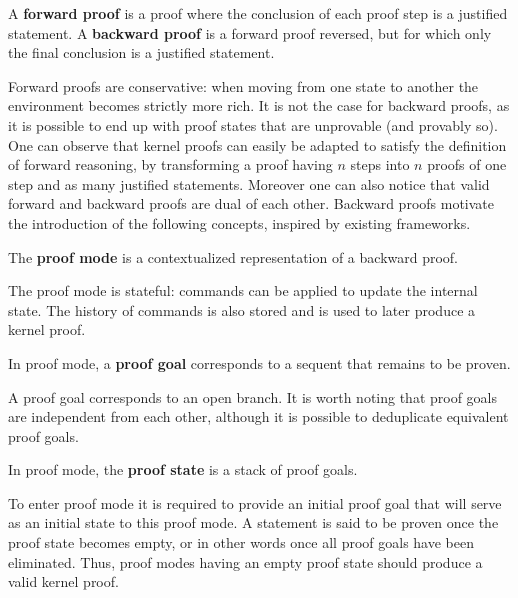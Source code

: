 \begin{definition}
A \textbf{forward proof} is a proof where the conclusion of each proof step is a justified statement.
A \textbf{backward proof} is a forward proof reversed, but for which only the final conclusion is a justified statement.
\end{definition}

Forward proofs are conservative: when moving from one state to another the environment becomes strictly more rich. It is not the case for backward proofs, as it is possible to end up with proof states that are unprovable (and provably so). One can observe that kernel proofs can easily be adapted to satisfy the definition of forward reasoning, by transforming a proof having $n$ steps into $n$ proofs of one step and as many justified statements. Moreover one can also notice that valid forward and backward proofs are dual of each other. Backward proofs motivate the introduction of the following concepts, inspired by existing frameworks.

\begin{definition}
The \textbf{proof mode} is a contextualized representation of a backward proof.
\end{definition}

The proof mode is stateful: commands can be applied to update the internal state. The history of commands is also stored and is used to later produce a kernel proof.

\begin{definition}
In proof mode, a \textbf{proof goal} corresponds to a sequent that remains to be proven.
\end{definition}

A proof goal corresponds to an open branch. It is worth noting that proof goals are independent from each other, although it is possible to deduplicate equivalent proof goals.

\begin{definition}
In proof mode, the \textbf{proof state} is a stack of proof goals.
\end{definition}

To enter proof mode it is required to provide an initial proof goal that will serve as an initial state to this proof mode. A statement is said to be proven once the proof state becomes empty, or in other words once all proof goals have been eliminated. Thus, proof modes having an empty proof state should produce a valid kernel proof.

